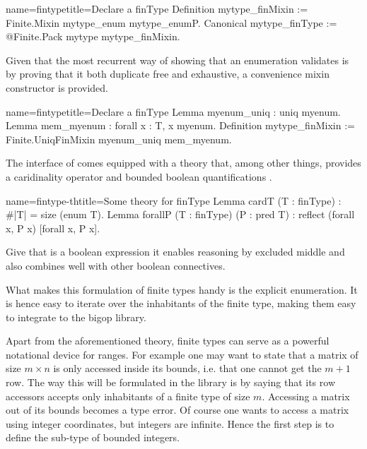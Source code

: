 \begin{coq}{name=fintype}{title=Declare a finType}
Definition mytype_finMixin := Finite.Mixin mytype_enum mytype_enumP.
Canonical mytype_finType := @Finite.Pack mytype mytype_finMixin.
\end{coq}

Given that the most recurrent way of showing that an enumeration
validates  is by proving that it both duplicate free
and exhaustive, a convenience mixin constructor is provided.

\begin{coq}{name=fintype}{title=Declare a finType}
Lemma myenum_uniq : uniq myenum.
Lemma mem_myenum : forall x : T, x \in myenum.
Definition mytype_finMixin := Finite.UniqFinMixin myenum_uniq mem_myenum.
\end{coq}

The interface of  comes equipped with a theory that, among
other things, provides a caridinality operator  and bounded
boolean quantifications \C{[forall x, P]}.

\begin{coq}{name=fintype-th}{title=Some theory for finType}
Lemma cardT (T : finType) : #|T| = size (enum T).
Lemma forallP (T : finType) (P : pred T) : reflect (forall x, P x) [forall x, P x].
\end{coq}

Give that \C{[forall x, P x]} is a boolean expression
it enables reasoning by excluded middle and also combines well with
other boolean connectives.

What makes this formulation of finite types handy is the explicit
enumeration.  It is hence easy to iterate over the inhabitants of the
finite type, making them easy to integrate to the bigop library.

\mcbLEARN{}
\mcbNOTES{}

Apart from the aforementioned theory, finite types can serve as a
powerful notational device for ranges.  For example one may want
to state that a matrix of size $m \times n$ is only accessed inside
its bounds, i.e. that one cannot get the $m+1$ row.  The way this will
be formulated in the \mcbMC{} library is by saying that its row
accessors accepts only inhabitants of a finite type of size $m$.
Accessing a matrix out of its bounds becomes a type error.
Of course one wants to access a matrix using integer coordinates, but
integers are infinite.  Hence the first step is to define the sub-type
of bounded integers.

